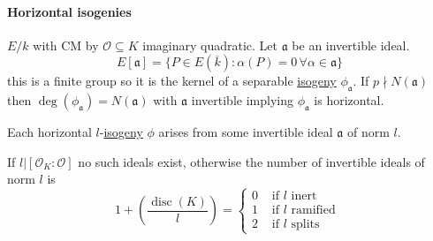 \documentclass[10pt,]{book}
\numberwithin{equation}{section}
\newcommand{\ideal}[1]{\mathfrak{#1}}
\newcommand{\lb}{[}
\newcommand{\rb}{]}
\newcommand{\ints}{\mathcal{O}}
\DeclareMathOperator{\disc}{disc}
\newcommand{\amp}{&}
\begin{document}
\paragraph[{Horizontal isogenies}]{Horizontal isogenies}\hypertarget{paragraphs-27}{}
\hypertarget{p-811}{}%
\(E/k\) with CM by \(\ints \subseteq K\) imaginary quadratic. Let \(\ideal a\) be an invertible ideal.%
\begin{equation*}
E\lb \ideal a \rb = \{ P \in E(\overline k) : \alpha (P)  = 0\, \forall \alpha \in \ideal a\}
\end{equation*}
this is a finite group so it is the kernel of a separable \hyperref[def-supersing-isog-isog]{isogeny} \(\phi_{\ideal a }\). If \(p \nmid N(\ideal a)\) then \(\deg(\phi_{\ideal a}) = N(\ideal a)\) with \(\ideal a\) invertible implying \(\phi_{\ideal a} \) is horizontal.%
\par
\hypertarget{p-812}{}%
Each horizontal \(l\)-\hyperref[def-supersing-isog-isog]{isogeny} \(\phi\) arises from some invertible ideal \(\ideal a\) of norm \(l\).%
\par
\hypertarget{p-813}{}%
If \(l | \lb \ints_K : \ints \rb \) no such ideals exist, otherwise the number of invertible ideals of norm \(l\) is%
\begin{equation*}
1+ \left(\frac {\disc(K)}{l}\right) = \begin{cases}0\amp\text{ if }l \text{ inert }\\ 1\amp\text{ if }l \text{ ramified }\\ 2\amp\text{ if }l \text{ splits}\end{cases}
\end{equation*}
%
%
%
\typeout{************************************************}
\typeout{************************************************}
%
\end{document}
